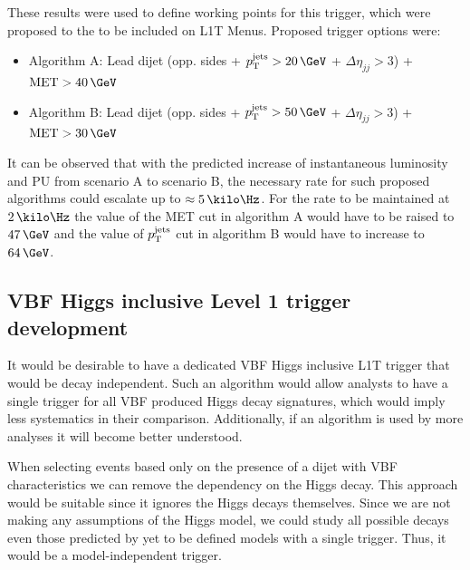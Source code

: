 These results were used to define working points for this trigger, which were proposed to the 
to be included on \gls{L1T} Menus. Proposed trigger options were:
\begin{itemize}
\item Algorithm A: Lead dijet (opp. sides + $\pt^{\text{jets}}>20\,\GeV$ + $\Delta\eta_{jj}>3$) + $\text{MET}>40\,\GeV$
\item Algorithm B: Lead dijet (opp. sides + $\pt^{\text{jets}}>50\,\GeV$ + $\Delta\eta_{jj}>3$) + $\text{MET}>30\,\GeV$
\end{itemize}

It can be observed that with the predicted increase of instantaneous luminosity and \gls{PU} from scenario A to scenario B, the necessary rate for such proposed algorithms could escalate up to $\approx 5\,\kilo\Hz$. For the rate to be maintained at $2\,\kilo\Hz$ the value of the MET cut in algorithm A would have to be raised to $47\,\GeV$ and the value of $p_{\mathrm{T}}^{\text{jets}}$ cut in algorithm B would have to increase to $64\,\GeV$.

\subsection{VBF Higgs inclusive Level 1 trigger development}
\label{SUBSECTION:ParkedDataAnalysis_ParkedTriggerDevelopment_InclusiveHiggsTrigger}


It would be desirable to have a dedicated \gls{VBF} Higgs inclusive \gls{L1T} trigger that would be decay independent. Such an algorithm would allow analysts to have a single trigger for all \gls{VBF} produced Higgs decay signatures, which would imply less systematics in their comparison. Additionally, if an algorithm is used by more analyses it will become better understood.

When selecting events based only on the presence of a dijet with \gls{VBF} characteristics we can remove the dependency on the Higgs decay. This approach would be suitable since it ignores the Higgs decays themselves. Since we are not making any assumptions of the Higgs model, we could study all possible decays even those predicted by yet to be defined models with a single trigger. Thus, it would be a model-independent trigger.

